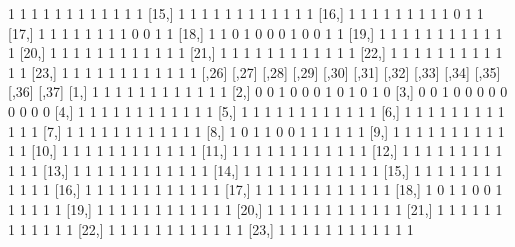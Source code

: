 \documentclass[a4paper]{article}
\begin{document}
\begin{Schunk}
\begin{Soutput}
[14,]     1     1     1     1     1     1     1     1     1     1     1     1
[15,]     1     1     1     1     1     1     1     1     1     1     1     1
[16,]     1     1     1     1     1     1     1     1     1     0     1     1
[17,]     1     1     1     1     1     1     1     1     0     0     1     1
[18,]     1     1     0     1     0     0     0     1     0     0     1     1
[19,]     1     1     1     1     1     1     1     1     1     1     1     1
[20,]     1     1     1     1     1     1     1     1     1     1     1     1
[21,]     1     1     1     1     1     1     1     1     1     1     1     1
[22,]     1     1     1     1     1     1     1     1     1     1     1     1
[23,]     1     1     1     1     1     1     1     1     1     1     1     1
      [,26] [,27] [,28] [,29] [,30] [,31] [,32] [,33] [,34] [,35] [,36] [,37]
 [1,]     1     1     1     1     1     1     1     1     1     1     1     1
 [2,]     0     0     1     0     0     0     1     0     1     0     1     0
 [3,]     0     0     1     0     0     0     0     0     0     0     0     0
 [4,]     1     1     1     1     1     1     1     1     1     1     1     1
 [5,]     1     1     1     1     1     1     1     1     1     1     1     1
 [6,]     1     1     1     1     1     1     1     1     1     1     1     1
 [7,]     1     1     1     1     1     1     1     1     1     1     1     1
 [8,]     1     0     1     1     0     0     1     1     1     1     1     1
 [9,]     1     1     1     1     1     1     1     1     1     1     1     1
[10,]     1     1     1     1     1     1     1     1     1     1     1     1
[11,]     1     1     1     1     1     1     1     1     1     1     1     1
[12,]     1     1     1     1     1     1     1     1     1     1     1     1
[13,]     1     1     1     1     1     1     1     1     1     1     1     1
[14,]     1     1     1     1     1     1     1     1     1     1     1     1
[15,]     1     1     1     1     1     1     1     1     1     1     1     1
[16,]     1     1     1     1     1     1     1     1     1     1     1     1
[17,]     1     1     1     1     1     1     1     1     1     1     1     1
[18,]     1     0     1     1     0     0     1     1     1     1     1     1
[19,]     1     1     1     1     1     1     1     1     1     1     1     1
[20,]     1     1     1     1     1     1     1     1     1     1     1     1
[21,]     1     1     1     1     1     1     1     1     1     1     1     1
[22,]     1     1     1     1     1     1     1     1     1     1     1     1
[23,]     1     1     1     1     1     1     1     1     1     1     1     1

\end{Soutput}
\end{Schunk}
\end{document}
